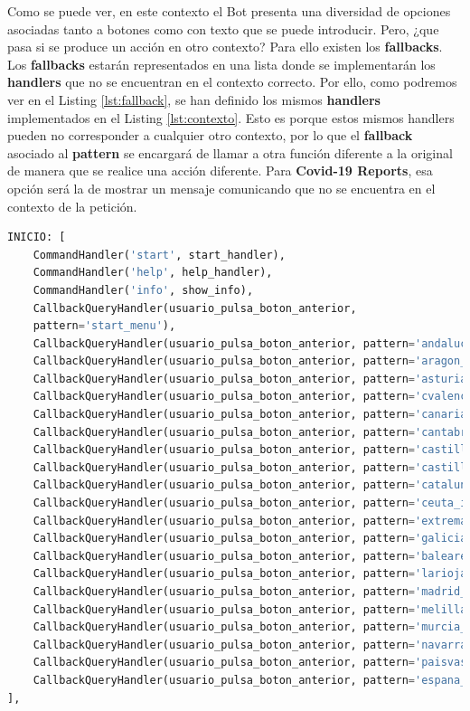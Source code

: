 Como se puede ver, en este contexto el Bot presenta una diversidad de opciones asociadas tanto a botones como con texto que se puede introducir. Pero, ¿que pasa si se produce un acción en otro contexto? Para ello existen los \textbf{fallbacks}. Los \textbf{fallbacks} estarán representados en una lista donde se implementarán los \textbf{handlers} que no se encuentran en el contexto correcto. Por ello, como podremos ver en el Listing \ref{lst:fallback}, se han definido los mismos \textbf{handlers} implementados en el Listing \ref{lst:contexto}. Esto es porque estos mismos handlers pueden no corresponder a cualquier otro contexto, por lo que el \textbf{fallback} asociado al \textbf{pattern} se encargará de llamar a otra función diferente a la original de manera que se realice una acción diferente. Para \textbf{Covid-19 Reports}, esa opción será la de mostrar un mensaje comunicando que no se encuentra en el contexto de la petición.

\begin{lstlisting}[language=Python, caption={Fallbacks.}, label={lst:fallback}]
INICIO: [
	CommandHandler('start', start_handler),
	CommandHandler('help', help_handler),
	CommandHandler('info', show_info),
	CallbackQueryHandler(usuario_pulsa_boton_anterior,
	pattern='start_menu'),
	CallbackQueryHandler(usuario_pulsa_boton_anterior, pattern='andalucia_info'),
	CallbackQueryHandler(usuario_pulsa_boton_anterior, pattern='aragon_info'),
	CallbackQueryHandler(usuario_pulsa_boton_anterior, pattern='asturias_info'),
	CallbackQueryHandler(usuario_pulsa_boton_anterior, pattern='cvalenciana_info'),
	CallbackQueryHandler(usuario_pulsa_boton_anterior, pattern='canarias_info'),
	CallbackQueryHandler(usuario_pulsa_boton_anterior, pattern='cantabria_info'),
	CallbackQueryHandler(usuario_pulsa_boton_anterior, pattern='castillalamancha_info'),
	CallbackQueryHandler(usuario_pulsa_boton_anterior, pattern='castillayleon_info'),
	CallbackQueryHandler(usuario_pulsa_boton_anterior, pattern='cataluna_info'),
	CallbackQueryHandler(usuario_pulsa_boton_anterior, pattern='ceuta_info'),
	CallbackQueryHandler(usuario_pulsa_boton_anterior, pattern='extremadura_info'),
	CallbackQueryHandler(usuario_pulsa_boton_anterior, pattern='galicia_info'),
	CallbackQueryHandler(usuario_pulsa_boton_anterior, pattern='baleares_info'),
	CallbackQueryHandler(usuario_pulsa_boton_anterior, pattern='larioja_info'),
	CallbackQueryHandler(usuario_pulsa_boton_anterior, pattern='madrid_info'),
	CallbackQueryHandler(usuario_pulsa_boton_anterior, pattern='melilla_info'),
	CallbackQueryHandler(usuario_pulsa_boton_anterior, pattern='murcia_info'),
	CallbackQueryHandler(usuario_pulsa_boton_anterior, pattern='navarra_info'),
	CallbackQueryHandler(usuario_pulsa_boton_anterior, pattern='paisvasco_info'),
	CallbackQueryHandler(usuario_pulsa_boton_anterior, pattern='espana_info'),
],
\end{lstlisting}

